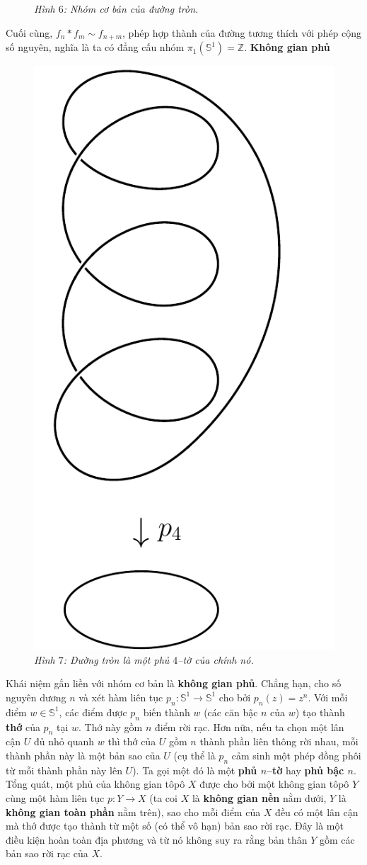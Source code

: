 \begin{multicols}{2}
\begin{figure}[H]
		\caption{\small\textit{\color{duongvaotoanhoc}Hình $6$: Nhóm cơ bản của đường tròn.}}
		\vspace*{-10pt}
	\end{figure}
	Cuối cùng, $f_n \ast f_m \sim f_{n+m}$, phép hợp thành của đường tương thích với phép cộng số nguyên, nghĩa là ta có đẳng cấu nhóm $\pi_1(\mathbb{S}^1) = \mathbb{Z}$.
	\vskip 0.1cm
	\textbf{\color{duongvaotoanhoc}Không gian phủ}
	\begin{figure}[H]
		\vspace*{-5pt}
		\centering
		\captionsetup{labelformat= empty, justification=centering}
		\includegraphics[width= 0.3\linewidth]{h7}
		\caption{\small\textit{\color{duongvaotoanhoc}Hình $7$: Đường tròn là một phủ $4$--tờ của chính nó.}}
		\vspace*{-10pt}
	\end{figure}
	Khái niệm gắn liền với nhóm cơ bản là {\bf\color{duongvaotoanhoc} không gian phủ}. Chẳng hạn, cho số nguyên dương $n$ và xét hàm liên tục $p_n: \mathbb{S}^1 \to \mathbb{S}^1$ cho bởi $p_n(z) = z^n$. Với mỗi điểm $w \in \mathbb{S}^1$, các điểm được $p_n$ biến thành $w$ (các căn bậc $n$ của $w$) tạo thành {\bf\color{duongvaotoanhoc} thớ} của $p_n$ tại $w$. Thớ này gồm $n$ điểm rời rạc. Hơn nữa, nếu ta chọn một lân cận $U$ đủ nhỏ quanh $w$ thì thớ của $U$ gồm $n$ thành phần liên thông rời nhau, mỗi thành phần này là một bản sao của $U$ (cụ thể là $p_n$ cảm sinh một phép đồng phôi từ mỗi thành phần này lên $U$). Ta gọi một đó là một {\bf\color{duongvaotoanhoc} phủ $n$--tờ} hay {\bf\color{duongvaotoanhoc} phủ bậc $n$}. 
	\vskip 0.1cm
	Tổng quát, một phủ của không gian tôpô $X$ được cho bởi một không gian tôpô $Y$ cùng một hàm liên tục $p: Y \to X$ (ta coi $X$ là {\bf\color{duongvaotoanhoc} không gian nền} nằm dưới, $Y$ là {\bf\color{duongvaotoanhoc} không gian toàn phần} nằm trên), sao cho mỗi điểm của $X$ đều có một lân cận mà thớ được tạo thành từ một số (có thể vô hạn) bản sao rời rạc. Đây là một điều kiện hoàn toàn địa phương và từ nó không suy ra rằng bản thân $Y$ gồm các bản sao rời rạc của $X$.

\end{multicols}

